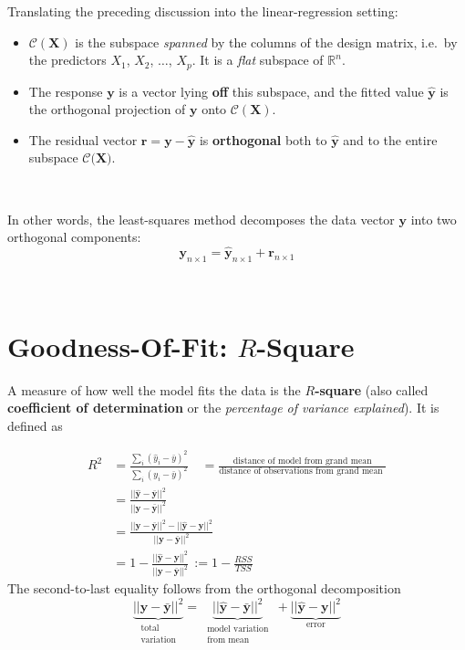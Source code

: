 \documentclass[
]{book}
\begin{document}
Translating the preceding discussion into the linear-regression setting:

\begin{itemize}
\item
  \(\mathcal{C}(\mathbf{X})\) is the subspace \emph{spanned} by the columns of the design matrix, i.e.~by the predictors \(X_1\), \(X_2\), \(\ldots\), \(X_p\). It is a \emph{flat} subspace of \(\mathbb{R}^n\).
\item
  The response \(\mathbf{y}\) is a vector lying \textbf{off} this subspace, and the fitted value \(\hat{\mathbf{y}}\) is the orthogonal projection of \(\mathbf{y}\) onto \(\mathcal{C}(\mathbf{X})\).
\item
  The residual vector \(\mathbf{r} = \mathbf{y} - \hat{\mathbf{y}}\) is \textbf{orthogonal} both to \(\hat{\mathbf{y}}\) and to the entire subspace \(\mathcal{C}\bigl( \mathbf{X} \bigr)\).
\end{itemize}

~

In other words, the least-squares method decomposes the data vector \(\mathbf{y}\) into two orthogonal components:
\[\mathbf{y}_{n\times 1} = \hat{\mathbf{y}}_{n\times 1} + \mathbf{r}_{n\times 1}\]

~

\section{\texorpdfstring{Goodness-Of-Fit: \(R\)-Square}{Goodness-Of-Fit: R-Square}}\label{goodness-of-fit-r-square}

A measure of how well the model fits the data is the \textbf{\(R\)-square} (also called \textbf{coefficient of determination} or the \emph{percentage of variance explained}). It is defined as

\begin{align*}
R^2 &=  \frac{\sum_i (\hat{y}_i - \bar{y})^2}{\sum_i (y_i - \bar{y})^2}\quad = \frac{\text{distance of model from grand mean}}{\text{distance of observations from grand mean }}\\ 
& =  \frac{||\hat{\mathbf{y}} - \bar{\mathbf{y}}||^2}{||\mathbf{y} - \bar{\mathbf{y}}||^2} \\
&= \frac{||\mathbf{y} - \bar{\mathbf{y}}||^2 - ||\hat{\mathbf{y}} - \mathbf{y}||^2  }{||\mathbf{y} - \bar{\mathbf{y}}||^2} \\
&= 1 - \frac{||\hat{\mathbf{y}} - \mathbf{y}||^2 }{||\mathbf{y} - \bar{\mathbf{y}}||^2}\, := 1 - \frac{RSS}{TSS}
\end{align*}
The second-to-last equality follows from the orthogonal decomposition
\[\underbrace{||\mathbf{y} - \bar{\mathbf{y}}||^2}_{\substack{\text{ total}\\\text{ variation  }}} = \underbrace{||\hat{\mathbf{y}} - \bar{\mathbf{y}}||^2}_{\substack{\text{ model variation }\\ \text{ from mean }}} + \underbrace{|| \hat{\mathbf{y}} - \mathbf{y}||^2}_{\text{ error  }}\]
\end{document}
